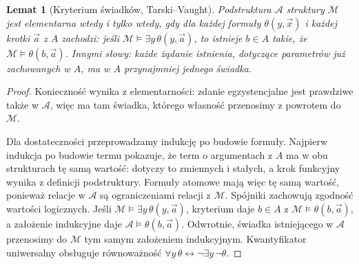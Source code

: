 \documentclass[11pt,a4paper]{article}
\numberwithin{equation}{section}
\theoremstyle{plain}
\newtheorem{lemat}[twierdzenie]{Lemat}
\theoremstyle{definition}
\theoremstyle{remark}
\begin{document}
\begin{lemat}[Kryterium świadków, Tarski--Vaught]\label{res:14:4}
Podstruktura $\mathcal A$ struktury $\mathcal M$ jest elementarna wtedy i tylko wtedy, gdy dla każdej formuły $\theta(y,\vec x)$ i każdej krotki $\vec a$ z $A$ zachodzi: jeśli $\mathcal M\models\exists y\,\theta(y,\vec a)$, to istnieje $b\in A$ takie, że $\mathcal M\models\theta(b,\vec a)$. Innymi słowy: każde żądanie istnienia, dotyczące parametrów już zachowanych w $A$, ma w $A$ przynajmniej jednego świadka.
\end{lemat}
\begin{proof}
Konieczność wynika z elementarności: zdanie egzystencjalne jest prawdziwe także w $\mathcal A$, więc ma tam świadka, którego własność przenosimy z powrotem do $\mathcal M$.

Dla dostateczności przeprowadzamy indukcję po budowie formuły. Najpierw indukcja po budowie termu pokazuje, że term o argumentach z $A$ ma w obu strukturach tę samą wartość: dotyczy to zmiennych i stałych, a krok funkcyjny wynika z definicji podstruktury. Formuły atomowe mają więc tę samą wartość, ponieważ relacje w $\mathcal A$ są ograniczeniami relacji z $\mathcal M$. Spójniki zachowują zgodność wartości logicznych. Jeśli $\mathcal M\models\exists y\,\theta(y,\vec a)$, kryterium daje $b\in A$ z $\mathcal M\models\theta(b,\vec a)$, a założenie indukcyjne daje $\mathcal A\models\theta(b,\vec a)$. Odwrotnie, świadka istniejącego w $\mathcal A$ przenosimy do $\mathcal M$ tym samym założeniem indukcyjnym. Kwantyfikator uniwersalny obsługuje równoważność $\forall y\,\theta\leftrightarrow\neg\exists y\,\neg\theta$.
\end{proof}
\end{document}
